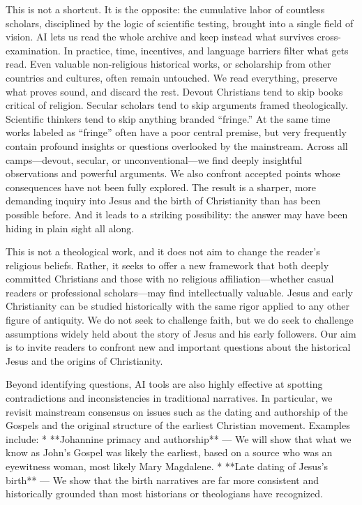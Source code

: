 This is not a shortcut.
It is the opposite: the cumulative labor of countless scholars, disciplined by the logic of scientific testing, brought into a single field of vision.
AI lets us read the whole archive and keep instead what survives cross-examination.
In practice, time, incentives, and language barriers filter what gets read.
Even valuable non-religious historical works, or scholarship from other countries and cultures, often remain untouched.
We read everything, preserve what proves sound, and discard the rest.
Devout Christians tend to skip books critical of religion.
Secular scholars tend to skip arguments framed theologically.
Scientific thinkers tend to skip anything branded “fringe.”
At the same time works labeled as “fringe” often have a poor central premise, but very frequently contain profound insights or questions overlooked by the mainstream.
Across all camps—devout, secular, or unconventional—we find deeply insightful observations and powerful arguments.
We also confront accepted points whose consequences have not been fully explored.
The result is a sharper, more demanding inquiry into Jesus and the birth of Christianity than has been possible before.
And it leads to a striking possibility: the answer may have been hiding in plain sight all along.

This is not a theological work, and it does not aim to change the reader’s religious beliefs.
Rather, it seeks to offer a new framework that both deeply committed Christians and those with no religious affiliation—whether casual readers or professional scholars—may find intellectually valuable.
Jesus and early Christianity can be studied historically with the same rigor applied to any other figure of antiquity.
We do not seek to challenge faith, but we do seek to challenge assumptions widely held about the story of Jesus and his early followers.
Our aim is to invite readers to confront new and important questions about the historical Jesus and the origins of Christianity.

Beyond identifying questions, AI tools are also highly effective at spotting contradictions and inconsistencies in traditional narratives.
In particular, we revisit mainstream consensus on issues such as the dating and authorship of the Gospels and the original structure of the earliest Christian movement.
Examples include:
* **Johannine primacy and authorship** — We will show that what we know as John’s Gospel was likely the earliest, based on a source who was an eyewitness woman, most likely Mary Magdalene.
* **Late dating of Jesus’s birth** — We show that the birth narratives are far more consistent and historically grounded than most historians or theologians have recognized.

